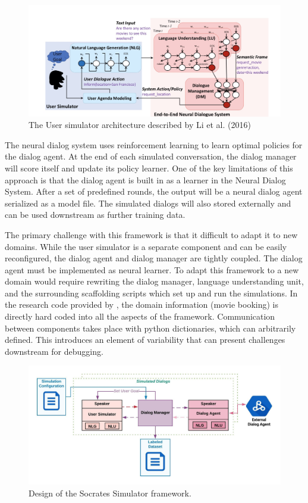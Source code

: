 \begin{figure}[h!]
	\label{fig:li_end_end}
	\includegraphics[width=\linewidth]{diagrams/li_end_to_end.jpeg}
	\caption{ The User simulator architecture described by Li et al. (2016) }
\end{figure}

The neural dialog system uses reinforcement learning to learn optimal policies for the dialog agent. At the end of each simulated conversation, the dialog manager will score itself and update its policy learner. One of the key limitations of this approach is that the dialog agent is built in as a learner in the Neural Dialog System. After a set of predefined rounds, the output will be a neural dialog agent serialized as a model file. The simulated dialogs will also stored externally and can be used downstream as further training data.

The primary challenge with this framework is that it difficult to adapt it to new domains. While the user simulator is a separate component and can be easily reconfigured, the dialog agent and dialog manager are tightly coupled. The dialog agent must be implemented as neural learner. To adapt this framework to a new domain would require rewriting the dialog manager, language understanding unit, and the surrounding scaffolding scripts which set up and run the simulations. In the research code provided by \cite{li_end_to_end}, the domain information (movie booking) is directly hard coded into all the aspects of the framework. Communication between components takes place with python dictionaries, which can arbitrarily defined. This introduces an element of variability that can present challenges downstream for debugging.

\begin{figure}[h!]
	\label{fig:socrates_sim_framework}
	\includegraphics[width=\linewidth]{diagrams/socrates_diagram.jpeg}
	\caption{ Design of the Socrates Simulator framework. }
\end{figure}

